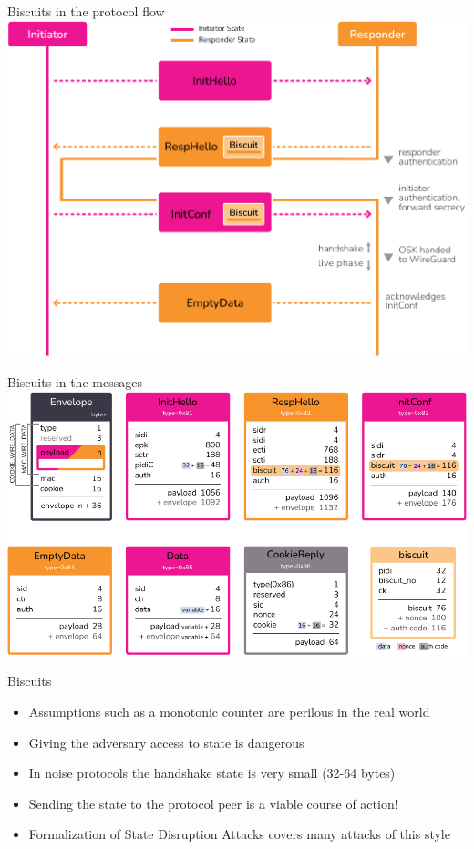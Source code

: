 \begin{frame}{Biscuits in the protocol flow}
  \includegraphics[height=.80\textheight]{graphics/rosenpass-wp-key-exchange-protocol.pdf}
\end{frame}

\begin{frame}{Biscuits in the messages}
  \includegraphics[height=.80\textheight]{graphics/rosenpass-wp-message-types.pdf}
\end{frame}

\begin{frame}{Biscuits}
  \begin{itemize}
    \item Assumptions such as a monotonic counter are perilous in the real world
    \item Giving the adversary access to state is dangerous
    \item In noise protocols the handshake state is very small (32-64 bytes)
    \item Sending the state to the protocol peer is a viable course of action!
    \item Formalization of State Disruption Attacks covers many attacks of this style
  \end{itemize}
\end{frame}

